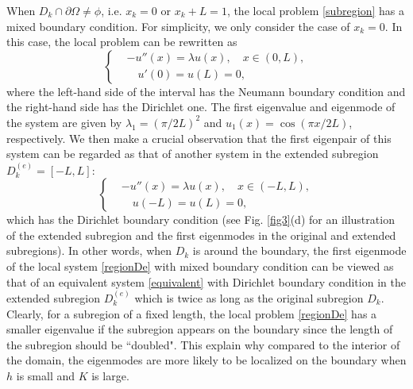 \documentclass[a4paper,11pt]{article}
\begin{document}
When $D_k \cap \partial \Omega \neq \phi$, i.e. $x_k=0$ or $x_k+L=1$, the local problem \eqref{subregion} has a mixed boundary condition. For simplicity, we only consider the case of $x_k = 0$. In this case, the local problem can be rewritten as
\begin{equation}\label{regionDe}
\left\{
\begin{split}
& - u''(x) = \lambda u(x), \quad x \in (0, L), \\
& \quad u'(0) = u(L) = 0,
\end{split}
\right.
\end{equation}
where the left-hand side of the interval has the Neumann boundary condition and the right-hand side has the Dirichlet one. The first eigenvalue and eigenmode of the system are given by $\lambda_1 = (\pi/2L)^2$ and $u_1(x) = \cos(\pi x/2L)$, respectively. We then make a crucial observation that the first eigenpair of this system can be regarded as that of another system in the extended subregion $D_k^{(e)} = [-L, L]$:
\begin{equation}\label{equivalent}
\left\{
\begin{split}
& - u''(x) = \lambda u(x), \quad x \in (-L, L), \\
& \quad u(-L) = u(L) = 0,
\end{split}
\right.
\end{equation}
which has the Dirichlet boundary condition (see Fig. \ref{fig3}(d) for an illustration of the extended subregion and the first eigenmodes in the original and extended subregions). In other words, when $D_k$ is around the boundary, the first eigenmode of the local system \eqref{regionDe} with mixed boundary condition can be viewed as that of an equivalent system \eqref{equivalent} with Dirichlet boundary condition in the extended subregion $D_k^{(e)}$ which is twice as long as the original subregion $D_k$. Clearly, for a subregion of a fixed length, the local problem \eqref{regionDe} has a smaller eigenvalue if the subregion appears on the boundary since the length of the subregion should be ``doubled". This explain why compared to the interior of the domain, the eigenmodes are more likely to be localized on the boundary when $h$ is small and $K$ is large.
\end{document}
